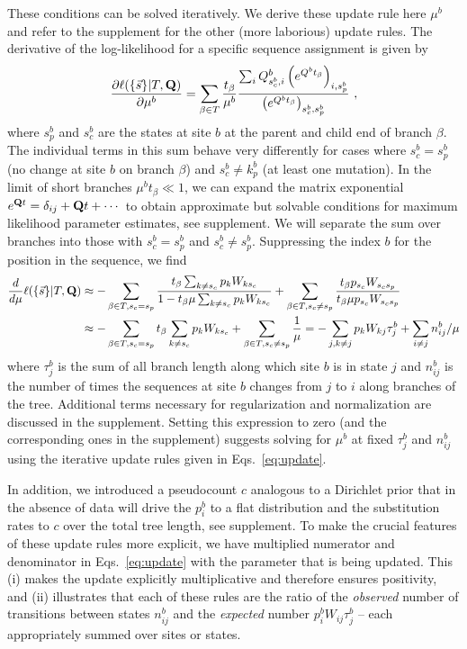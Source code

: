 \documentclass[aps,rmp,twocolumn]{revtex4}
\newcommand{\mat}[1]{{\bf #1}}
\newcommand{\eqp}{p}
\newcommand{\pc}{c}
\newcommand{\lh}{\ell}
\begin{document}
These conditions can be solved iteratively. We derive these update rule here $\mu^b$ and refer to the supplement for the other (more laborious) update rules.
The derivative of the log-likelihood for a specific sequence assignment is given by
\begin{equation}
	\frac{\partial \lh(\{\vec{s}\}|T,\mat{Q})}{\partial \mu^b} = \sum_{\beta\in T} \frac{t_\beta}{\mu^b}\frac{\sum_i Q^b_{s^b_c,i}\left( e^{Q^bt_\beta} \right)_{i, s^b_p}}{\left( e^{Q^bt_\beta} \right)_{s^b_c, s^b_p}} \ ,
\end{equation}
where $s^b_p$ and $s^b_c$ are the states at site $b$ at the parent and child end of branch $\beta$.
The individual terms in this sum behave very differently for cases where $s^b_c=s^b_p$ (no change at site $b$ on branch $\beta$) and $s^b_c\neq k^b_p$ (at least one mutation).
In the limit of short branches $\mu^b t_\beta \ll 1$, we can expand the matrix exponential $e^{\mat{Q}t}=\delta_{ij} + \mat{Q}t+\cdots$ to obtain approximate but solvable conditions for maximum likelihood parameter estimates, see supplement.
We will separate the sum over branches into those with $s^b_c=s^b_p$  and $s^b_c\neq s^b_p$.
Suppressing the index $b$ for the position in the sequence, we find
\begin{equation}
\begin{split}
	\frac{d}{d \mu} \lh (\{\vec{s}\} |T, \mat{Q}) &
	 \approx  -\sum_{\beta\in T,s_c=s_p} \frac{t_\beta \sum_{k\neq s_c} \eqp_{k} W_{k s_c}}{1 - t_\beta \mu \sum_{k\neq s_c} \eqp_k W_{ks_c}}
	 + \sum_{\beta\in T,s_c\neq s_p} \frac{t_\beta \eqp_{s_c} W_{s_cs_p}}{t_\beta \mu \eqp_{s_c} W_{s_c s_p}}\\
	 & \approx  -\sum_{\beta\in T,s_c=s_p} t_\beta \sum_{k\neq s_c} \eqp_{k} W_{k s_c} + \sum_{\beta\in T,s_c\neq s_p} \frac{1}{\mu} = - \sum_{j, k\neq j} \eqp_k W_{kj} \tau^b_j + \sum_{i\neq j} n^b_{ij}/\mu
	\end{split}
\end{equation}
where $\tau^b_j$ is the sum of all branch length along which site $b$ is in state $j$ and $n^b_{ij}$ is the number of times the sequences at site $b$ changes from $j$ to $i$ along branches of the tree.
Additional terms necessary for regularization and normalization are discussed in the supplement.
Setting this expression to zero (and the corresponding ones in the supplement) suggests solving for $\mu^b$ at fixed $\tau^b_j$ and $n^b_{ij}$ using the iterative update rules given in Eqs.~\ref{eq:update}.

In addition, we introduced a pseudocount $\pc$ analogous to a Dirichlet prior that in the absence of data will drive the $\eqp_i^b$ to a flat distribution and the substitution rates to $\pc$ over the total tree length, see supplement.
To make the crucial features of these update rules more explicit, we have multiplied numerator and denominator in Eqs.~\ref{eq:update} with the parameter that is being updated. This (i) makes the update explicitly multiplicative and therefore ensures positivity, and (ii) illustrates that each of these rules are the ratio of the {\it observed} number of transitions between states $n^b_{ij}$ and the {\it expected} number $\eqp^b_i W_{ij}\tau_j^b$ -- each appropriately summed over sites or states.
\end{document}
